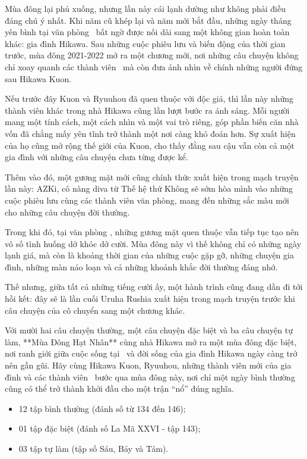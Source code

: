 \documentclass[main.tex]{subfiles}
\begin{document}
Mùa đông lại phủ xuống, nhưng lần này cái lạnh dường như không phải điều đáng chú ý nhất. Khi năm cũ khép lại và năm mới bắt đầu, những ngày tháng yên bình tại văn phòng \hll\  bất ngờ được nối dài sang một không gian hoàn toàn khác: gia đình Hikawa. Sau những cuộc phiêu lưu và biến động của thời gian trước, mùa đông 2021-2022 mở ra một chương mới, nơi những câu chuyện không chỉ xoay quanh các thành viên \hll\ mà còn đưa ánh nhìn về chính những người đứng sau Hikawa Kuon.

Nếu trước đây Kuon và Ryuuhou đã quen thuộc với độc giả, thì lần này những thành viên khác trong nhà Hikawa cũng lần lượt bước ra ánh sáng. Mỗi người mang một tính cách, một cách nhìn và một vai trò riêng, góp phần biến căn nhà vốn đã chẳng mấy yên tĩnh trở thành một nơi càng khó đoán hơn. Sự xuất hiện của họ cũng mở rộng thế giới của Kuon, cho thấy đằng sau cậu vẫn còn cả một gia đình với những câu chuyện chưa từng được kể.

Thêm vào đó, một gương mặt mới cũng chính thức xuất hiện trong mạch truyện lần này: AZKi, cô nàng diva từ Thế hệ thứ Không sẽ sớm hòa mình vào những cuộc phiêu lưu cùng các thành viên văn phòng, mang đến những sắc màu mới cho những câu chuyện đời thường.

Trong khi đó, tại văn phòng \hll, những gương mặt quen thuộc vẫn tiếp tục tạo nên vô số tình huống dở khóc dở cười. Mùa đông này vì thế không chỉ có những ngày lạnh giá, mà còn là khoảng thời gian của những cuộc gặp gỡ, những chuyện gia đình, những màn náo loạn và cả những khoảnh khắc đời thường đáng nhớ.

Thế nhưng, giữa tất cả những tiếng cười ấy, một hành trình cũng đang dần đi tới hồi kết: đây sẽ là lần cuối Uruha Rushia xuất hiện trong mạch truyện trước khi câu chuyện của cô chuyển sang một chương khác.

Với mười hai câu chuyện thường, một câu chuyện đặc biệt và ba câu chuyện tự làm, **Mùa Đông Hạt Nhân** cùng nhà Hikawa mở ra một mùa đông đặc biệt, nơi ranh giới giữa cuộc sống tại \hll\ và đời sống của gia đình Hikawa ngày càng trở nên gần gũi. Hãy cùng Hikawa Kuon, Ryuuhou, những thành viên mới của gia đình và các thành viên \hll\ bước qua mùa đông này, nơi chỉ một ngày bình thường cũng có thể trở thành khởi đầu cho một trận ``nổ'' đúng nghĩa.

{}
\begin{itemize}
\item 12 tập bình thường (đánh số từ 134 đến 146);
\item 01 tập đặc biệt (đánh số La Mã XXVI - tập 143);
\item 03 tập tự làm (tập số Sáu, Bảy và Tám).
\end{itemize}
\end{document}
